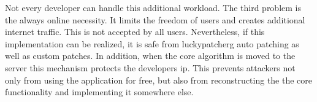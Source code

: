 Not every developer can handle this additional workload.
\newline
The third problem is the always online necessity.
It limits the freedom of users and creates additional internet traffic.
This is not accepted by all users.
\newline
\newline
Nevertheless, if this implementation can be realized, it is safe from \gls{luckypatcherg} auto patching as well as custom patches.
In addition, when the core algorithm is moved to the server this mechanism protects the developers \gls{ip}.
This prevents attackers not only from using the application for free, but also from reconstructing the the core functionality and implementing it somewhere else.
